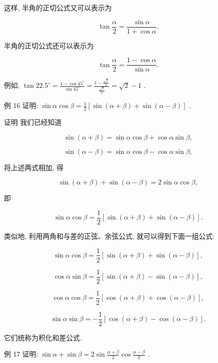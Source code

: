 \documentclass[10pt]{article}
\begin{document}
这样, 半角的正切公式又可以表示为

\[
\tan \frac{\alpha }{2} = \frac{\sin \alpha }{1 + \cos \alpha }.
\]

半角的正切公式还可以表示为

\[
\tan \frac{\alpha }{2} = \frac{1 - \cos \alpha }{\sin \alpha }.
\]

例如, \(\tan {22.5}^{ \circ  } = \frac{1 - \cos {45}^{ \circ  }}{\sin {45}^{ \circ  }} = \frac{1 - \frac{\sqrt{2}}{2}}{\frac{\sqrt{2}}{2}} = \sqrt{2} - 1\) .

例 16 证明: \(\sin \alpha \cos \beta  = \frac{1}{2}\left\lbrack  {\sin \left( {\alpha  + \beta }\right)  + \sin \left( {\alpha  - \beta }\right) }\right\rbrack\) .

证明 我们已经知道

\[
\sin \left( {\alpha  + \beta }\right)  = \sin \alpha \cos \beta  + \cos \alpha \sin \beta ,
\]

\[
\sin \left( {\alpha  - \beta }\right)  = \sin \alpha \cos \beta  - \cos \alpha \sin \beta ,
\]

将上述两式相加, 得

\[
\sin \left( {\alpha  + \beta }\right)  + \sin \left( {\alpha  - \beta }\right)  = 2\sin \alpha \cos \beta ,
\]

即

\[
\sin \alpha \cos \beta  = \frac{1}{2}\left\lbrack  {\sin \left( {\alpha  + \beta }\right)  + \sin \left( {\alpha  - \beta }\right) }\right\rbrack  .
\]

类似地, 利用两角和与差的正弦、余弦公式, 就可以得到下面一组公式:

\[
\sin \alpha \cos \beta  = \frac{1}{2}\left\lbrack  {\sin \left( {\alpha  + \beta }\right)  + \sin \left( {\alpha  - \beta }\right) }\right\rbrack  ,
\]

\[
\cos \alpha \sin \beta  = \frac{1}{2}\left\lbrack  {\sin \left( {\alpha  + \beta }\right)  - \sin \left( {\alpha  - \beta }\right) }\right\rbrack  ,
\]

\[
\cos \alpha \cos \beta  = \frac{1}{2}\left\lbrack  {\cos \left( {\alpha  + \beta }\right)  + \cos \left( {\alpha  - \beta }\right) }\right\rbrack  ,
\]

\[
\sin \alpha \sin \beta  =  - \frac{1}{2}\left\lbrack  {\cos \left( {\alpha  + \beta }\right)  - \cos \left( {\alpha  - \beta }\right) }\right\rbrack  .
\]

它们统称为积化和差公式.

例 17 证明: \(\sin \alpha  + \sin \beta  = 2\sin \frac{\alpha  + \beta }{2}\cos \frac{\alpha  - \beta }{2}\) .
\end{document}
